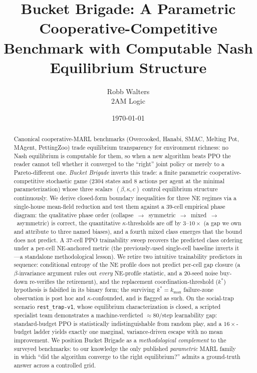 \documentclass{anvil-paper}
\title{Bucket Brigade: A Parametric Cooperative-Competitive Benchmark with
Computable Nash Equilibrium Structure}
\author{Robb Walters \\ 2AM Logic}
\date{\today}
\begin{document}
\maketitle

\begin{abstract}
Canonical cooperative-MARL benchmarks (Overcooked, Hanabi, SMAC, Melting Pot,
MAgent, PettingZoo) trade equilibrium transparency for environment richness:
no Nash equilibrium is computable for them, so when a new algorithm beats PPO
the reader cannot tell whether it converged to the ``right'' joint policy or
merely to a Pareto-different one. \emph{Bucket Brigade} inverts this trade: a
finite parametric cooperative-competitive stochastic game ($2304$ states and
$8$ actions per agent at the minimal parameterization) whose three
scalars~$(\beta,\kappa,c)$ control equilibrium structure continuously. We
derive closed-form boundary inequalities for three NE regimes via a
single-house mean-field reduction and test them against a $39$-cell empirical
phase diagram: the qualitative phase order
(collapse~$\to$~symmetric~$\to$~mixed~$\to$~asymmetric) is correct, the
quantitative $\kappa$-thresholds are off by $3$--$10{\times}$ (a gap we own
and attribute to three named biases), and a fourth \textsf{mixed} class
emerges that the bound does not predict. A $37$-cell PPO trainability sweep
recovers the predicted class ordering under a per-cell NE-anchored metric
(the previously-used single-cell baseline inverts it---a standalone
methodological lesson). We retire two intuitive trainability predictors in
sequence: conditional entropy of the NE profile does not predict per-cell gap
closure (a $\beta$-invariance argument rules out \emph{every} NE-profile
statistic, and a $20$-seed noise buy-down re-verifies the retirement), and
the replacement coordination-threshold ($k^{*}$) hypothesis is falsified in
its binary form; the surviving $k^{*}{=}k_{\max}$ failure-zone observation is
post hoc and $\kappa$-confounded, and is flagged as such. On the social-trap
scenario \texttt{rest\_trap-v1}, whose equilibrium characterization is
closed, a scripted specialist team demonstrates a machine-verdicted
${\approx}80$/step learnability gap: standard-budget PPO is statistically
indistinguishable from random play, and a $16{\times}$-budget ladder yields
exactly one marginal, variance-driven escape with no mean improvement. We
position Bucket Brigade as a \emph{methodological complement} to the surveyed
benchmarks: to our knowledge the only published \emph{parametric} MARL family
in which ``did the algorithm converge to the right equilibrium?'' admits a
ground-truth answer across a controlled grid.
\end{abstract}
\end{document}
